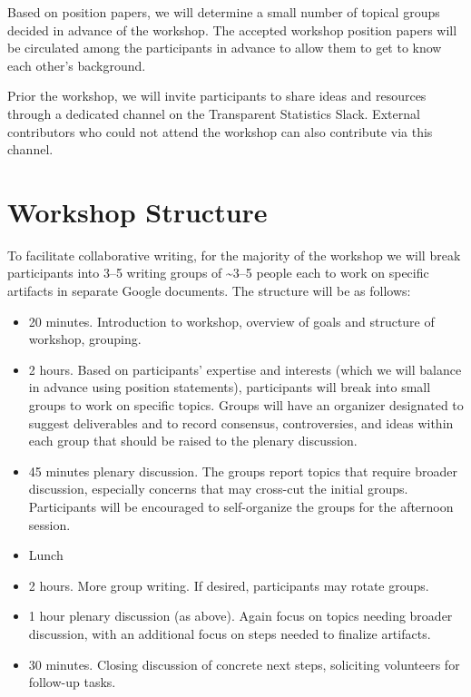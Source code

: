 \documentclass[sigchi-a, authorversion]{acmart}
\begin{document}
Based on position papers, we will determine a small number of topical groups decided in advance of the workshop. The accepted workshop position papers will be circulated among the participants in advance to allow them to get to know each other's background.

Prior the workshop, we will invite participants to share ideas and resources through a dedicated channel on the Transparent Statistics Slack. External contributors who could not attend the workshop can also contribute via this channel.



\section{Workshop Structure}

To facilitate collaborative writing, for the majority of the workshop we will break participants into 3--5 writing groups of \textasciitilde 3--5 people each to work on specific artifacts in separate Google documents. The structure will be as follows:

\begin{itemize}
\item 20 minutes. Introduction to workshop, overview of goals and structure of workshop, grouping.
\item 2 hours. Based on participants' expertise and interests (which we will balance in advance using position statements), participants will break into small groups to work on specific topics. Groups will have an organizer designated to suggest deliverables and to record consensus, controversies, and ideas within each group that should be raised to the plenary discussion.
\item 45 minutes plenary discussion. The groups report topics that require broader discussion, especially concerns that may cross-cut the initial groups. Participants will be encouraged to self-organize the groups for the afternoon session.
\item Lunch
\item 2 hours. More group writing. If desired, participants may rotate groups.
\item 1 hour plenary discussion (as above). Again focus on topics needing broader discussion, with an additional focus on steps needed to finalize artifacts.
\item 30 minutes. Closing discussion of concrete next steps, soliciting volunteers for follow-up tasks.
\end{itemize}
\end{document}
